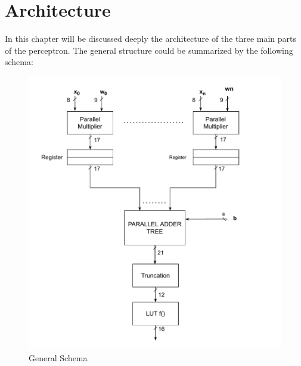 \chapter{Architecture}

In this chapter will be discussed deeply the architecture of the three main parts of the perceptron. The general structure could be summarized by the following schema:
\begin{figure}[H]
	\centering
	\includegraphics[width=12cm]{img/architecture_general_schema.pdf}
	\caption{General Schema}
\end{figure}

